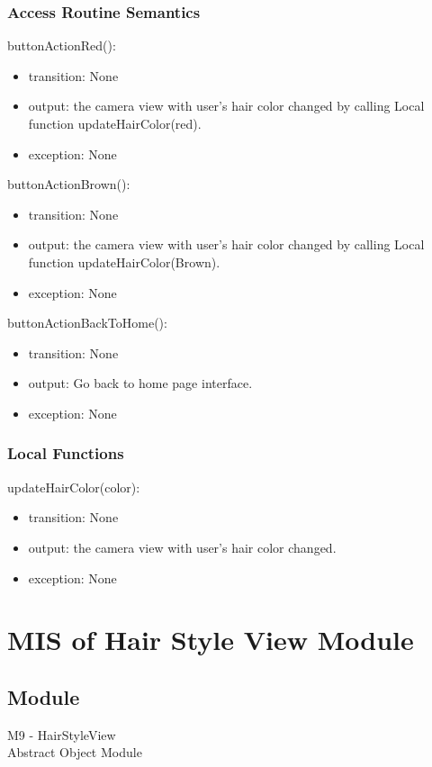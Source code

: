 \documentclass[12pt, titlepage]{article}
\begin{document}
\subsubsection{Access Routine Semantics}

\noindent buttonActionRed():
\begin{itemize}
\item transition: None 
\item output: the camera view with user's hair color changed by calling Local function updateHairColor(red).
\item exception: None
\end{itemize}

\noindent buttonActionBrown():
\begin{itemize}
\item transition: None 
\item output: the camera view with user's hair color changed by calling Local function updateHairColor(Brown).
\item exception: None
\end{itemize}

\noindent buttonActionBackToHome():
\begin{itemize}
\item transition: None 
\item output: Go back to home page interface.
\item exception: None
\end{itemize}

\subsubsection{Local Functions}
\noindent updateHairColor(color):
\begin{itemize}
\item transition: None 
\item output: the camera view with user's hair color changed.
\item exception: None
\end{itemize}

\newpage
\section{MIS of Hair Style View Module} \label{Module} 
\subsection{Module}
M9 - HairStyleView\\
Abstract Object Module
\end{document}
